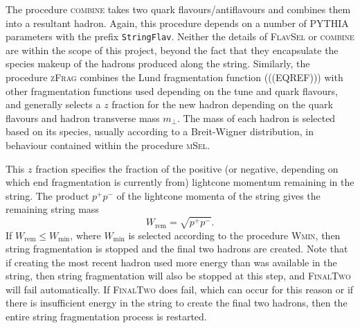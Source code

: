 \documentclass[12pt,a4paper]{report}
\begin{document}
The procedure \textsc{combine} takes two quark flavours/antiflavours and combines them into a resultant hadron. Again, this procedure depends on a number of PYTHIA parameters with the prefix \texttt{StringFlav}. Neither the details of \textsc{FlavSel} or \textsc{combine} are within the scope of this project, beyond the fact that they encapsulate the species makeup of the hadrons produced along the string. Similarly, the procedure \textsc{zFrag} combines the Lund fragmentation function (((EQREF))) with other fragmentation functions used depending on the tune and quark flavours, and generally selects a $z$ fraction for the new hadron depending on the quark flavours and hadron transverse mass $m_\perp$. The mass of each hadron is selected based on its species, usually according to a Breit-Wigner distribution, in behaviour contained within the procedure \textsc{mSel}.

This $z$ fraction specifies the fraction of the positive (or negative, depending on which end fragmentation is currently from) lightcone momentum remaining in the string. The product $p^+ p^-$ of the lightcone momenta of the string gives the remaining string mass
\begin{equation}
  W_\text{rem} = \sqrt{p^+ p^-}.
\end{equation}
If $W_\text{rem} \leq W_\text{min}$, where $W_\text{min}$ is selected according to the procedure \textsc{Wmin}, then string fragmentation is stopped and the final two hadrons are created. Note that if creating the most recent hadron used more energy than was available in the string, then string fragmentation will also be stopped at this step, and \textsc{FinalTwo} will fail automatically. If \textsc{FinalTwo} does fail, which can occur for this reason or if there is insufficient energy in the string to create the final two hadrons, then the entire string fragmentation process is restarted.
\end{document}
